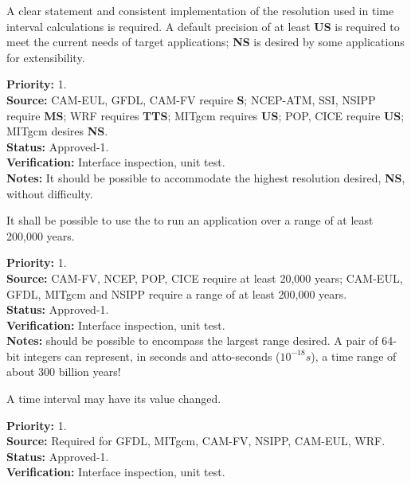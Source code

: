 A clear statement and consistent implementation of the resolution used in time interval
calculations is required.  A default precision of at least {\bf US} is required to meet the
current needs of target applications; {\bf NS} is desired by some applications for extensibility.
\begin{reqlist}
{\bf Priority:} 1. \\
{\bf Source:} CAM-EUL, GFDL, CAM-FV require {\bf S};  
NCEP-ATM, SSI, NSIPP require {\bf MS}; 
WRF requires {\bf TTS}; 
MITgcm requires {\bf US}; 
POP, CICE require {\bf US}; 
MITgcm desires {\bf NS}. \\
{\bf Status:} Approved-1. \\
{\bf Verification:} Interface inspection, unit test. \\
{\bf Notes:}  It should be possible to accommodate the highest resolution desired, {\bf NS},
without difficulty.  
\end{reqlist}

It shall be possible to use the \funcname to run an application over a range of at 
least 200,000 years.  
\begin{reqlist}
{\bf Priority:} 1. \\
{\bf Source:} CAM-FV, NCEP, POP, CICE require at least 20,000 years; 
CAM-EUL, GFDL, MITgcm and NSIPP require a range of at least 200,000 years. \\
{\bf Status:} Approved-1. \\
{\bf Verification:} Interface inspection, unit test. \\
{\bf Notes:} should be possible to encompass the largest range desired.  
A pair of 64-bit integers can represent, in seconds and atto-seconds ($10^{-18}s$), 
a time range of about 300 billion years!
\end{reqlist}


A time interval may have its value changed.
\begin{reqlist}
{\bf Priority:} 1. \\
{\bf Source:} Required for GFDL, MITgcm, CAM-FV, NSIPP, CAM-EUL, WRF.\\
{\bf Status:} Approved-1. \\
{\bf Verification:} Interface inspection, unit test. 
\end{reqlist}


